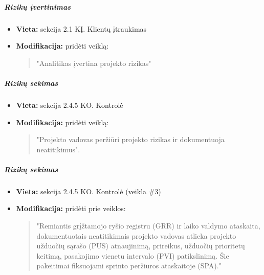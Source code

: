 \documentclass{article}
\begin{document}
\subparagraph{Rizikų įvertinimas}
\begin{itemize}
    \item \textbf{Vieta:} sekcija 2.1 KĮ. Klientų įtraukimas
    \item \textbf{Modifikacija:} pridėti veiklą:
    \begin{quote}
        "Analitikas įvertina projekto rizikas"
    \end{quote}
\end{itemize}

\subparagraph{Rizikų sekimas}
\begin{itemize}
    \item \textbf{Vieta:} sekcija 2.4.5 KO. Kontrolė
    \item \textbf{Modifikacija:} pridėti veiklą:
    \begin{quote}
        "Projekto vadovas peržiūri projekto rizikas ir dokumentuoja neatitikimus".
    \end{quote}
\end{itemize}

\subparagraph{Rizikų sekimas}
\begin{itemize}
    \item \textbf{Vieta:} sekcija 2.4.5 KO. Kontrolė (veikla \#3)
    \item \textbf{Modifikacija:} pridėti prie veiklos:
    \begin{quote}
        "Remiantis grįžtamojo ryšio registru (GRR) ir laiko valdymo ataskaita, dokumentuotais neatitikimais projekto vadovas atlieka projekto užduočių sąrašo (PUS) atnaujinimą, prireikus, užduočių prioritetų keitimą, pasakojimo vienetu intervalo (PVI) patikslinimą. Šie pakeitimai fiksuojami sprinto peržiuros ataskaitoje (SPA)."
    \end{quote}
\end{itemize}
\end{document}

